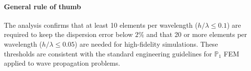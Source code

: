 \paragraph{General rule of thumb} The analysis confirms that at least 10 elements per wavelength (\(h/\lambda \leq 0.1\)) are required to keep the dispersion error below \(2\%\) and that 20 or more elements per wavelength (\(h/\lambda \leq 0.05\)) are needed for high-fidelity simulations. These thresholds are consistent with the standard engineering guidelines for \(\mathbb{P}_1\) FEM applied to wave propagation problems.